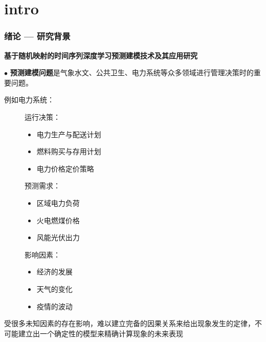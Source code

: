 \section{intro}

\begin{frame}
    \frametitle{绪论 — 研究背景}

    \textbf{基于随机映射的时间序列深度学习预测建模技术及其应用研究}

    \vspace*{1em}
    $\bullet$ \textbf{预测建模问题}是气象水文、公共卫生、电力系统等众多领域进行管理决策时的重要问题。

    例如电力系统：
    \begin{figure}
        \begin{minipage}[b]{0.32\textwidth}
            运行决策：
            \begin{itemize}
                \item 电力生产与配送计划
                \item 燃料购买与存用计划
                \item 电力价格定价策略
            \end{itemize}
        \end{minipage}
        \hspace{1em}
        \begin{minipage}[b]{0.32\textwidth}
            预测需求：
            \begin{itemize}
                \item 区域电力负荷
                \item 火电燃煤价格
                \item 风能光伏出力
            \end{itemize}
        \end{minipage}
        \hfill
        \begin{minipage}[b]{0.3\textwidth}
            影响因素：
            \begin{itemize}
                \item 经济的发展
                \item 天气的变化
                \item 疫情的波动
            \end{itemize}
        \end{minipage}
    \end{figure}

    受很多未知因素的存在影响，难以建立完备的因果关系来给出现象发生的定律，不可能建立出一个确定性的模型来精确计算现象的未来表现

\end{frame}

